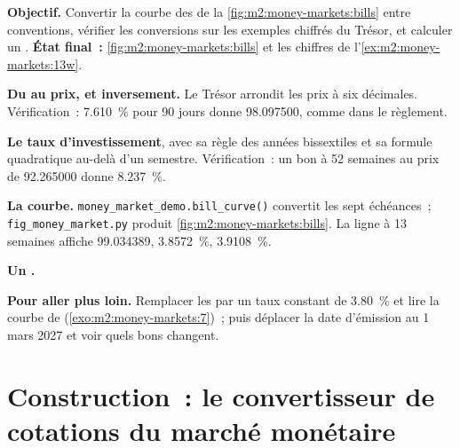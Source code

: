 \begin{tutorial}
\textbf{Objectif.} Convertir la courbe des  de la \cref{fig:m2:money-markets:bills}
entre conventions, vérifier les conversions sur les exemples chiffrés du Trésor,
et calculer un . \textbf{État final~:}
\cref{fig:m2:money-markets:bills} et les chiffres de
l'\cref{ex:m2:money-markets:13w}.
\begin{tutsteps}
\item \textbf{Du  au prix, et inversement.} Le Trésor arrondit les prix à six
décimales.
\label{lst:m2:money-markets:price}
Vérification~: 7.610~\% pour 90 jours donne 98.097500, comme dans le règlement.
\item \textbf{Le taux d'investissement}, avec sa règle des années bissextiles et sa formule quadratique
au-delà d'un semestre.
\label{lst:m2:money-markets:bey}
Vérification~: un bon à 52 semaines au prix de 92.265000 donne 8.237~\%.
\item \textbf{La courbe.} \texttt{money\_market\_demo.bill\_curve()} convertit
les sept échéances~; \texttt{fig\_money\_market.py} produit
\cref{fig:m2:money-markets:bills}. La ligne à 13 semaines affiche 99.034389,
3.8572~\%, 3.9108~\%.
\item \textbf{Un .}
\label{lst:m2:money-markets:turn}
\end{tutsteps}
\textbf{Pour aller plus loin.} Remplacer les  par un taux constant de 3.80~\% et
lire la courbe de  (\cref{exo:m2:money-markets:7})~; puis déplacer la
date d'émission au 1 mars 2027 et voir quels bons changent.
\end{tutorial}

\section{Construction~: le convertisseur de cotations du marché monétaire}\label{bld:m2:money-markets:mmyield}

